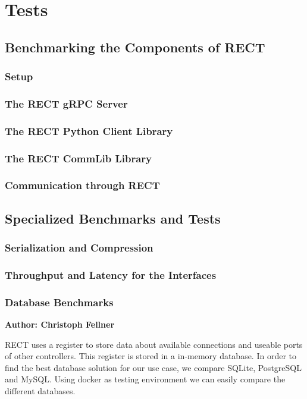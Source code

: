 \chapter{Tests}

\section{Benchmarking the Components of RECT}
\subsection{Setup}
\subsection{The RECT gRPC Server}
\subsection{The RECT Python Client Library}
\subsection{The RECT CommLib Library}
\subsection{Communication through RECT}

\section{Specialized Benchmarks and Tests}
\subsection{Serialization and Compression}

\subsection{Throughput and Latency for the Interfaces}

\subsection{Database Benchmarks}
\textbf{Author: Christoph Fellner}

RECT uses a register to store data about available connections and useable ports of other controllers. This register is stored in a in-memory database. In order to find the 
best database solution for our use case, we compare SQLite, PostgreSQL and MySQL. Using docker as testing environment we can easily compare the different databases.

